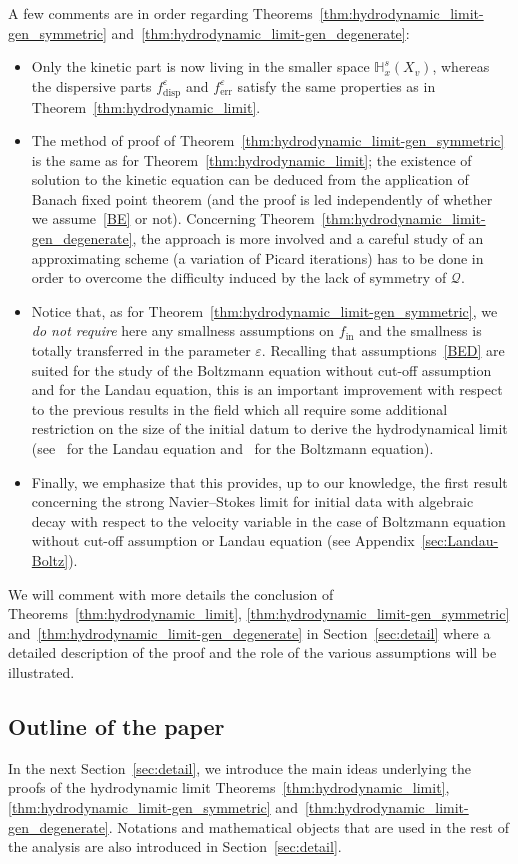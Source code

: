 \documentclass[10pt]{amsart}
\theoremstyle{definition}\newtheorem{defi}[theo]{Definition}\newtheorem{rema}[theo]{Remark}\newtheorem{exam}[theo]{Example}\newtheorem{exem}[theo]{Example}\newtheorem{nota}[theo]{Notation}
\newcommand{\ini}{\mathrm{in}}
\newcommand{\err}{\mathrm{err}}
\newcommand{\disp}{\mathrm{disp}}
\newcommand{\bbH}{\mathbb{H}}
\newcommand{\QQ}{\mathcal{Q}}
\newcommand{\Sl}{X}
\newcommand*\eps{{\varepsilon}}
\begin{document}
A few comments are in order regarding Theorems~\ref{thm:hydrodynamic_limit-gen_symmetric} and~\ref{thm:hydrodynamic_limit-gen_degenerate}:
\begin{itemize}
\item Only the kinetic part is now living in the smaller space $\bbH^s_x(\Sl_v)$, whereas the dispersive parts $f_\disp^\eps$ and $f^\eps_\err$ satisfy the same properties as in Theorem~\ref{thm:hydrodynamic_limit}.
\item The method of proof of Theorem~\ref{thm:hydrodynamic_limit-gen_symmetric} is the same as for Theorem~\ref{thm:hydrodynamic_limit}; the existence of solution to the kinetic equation can be deduced from the application of Banach fixed point theorem (and the proof is led independently of whether we assume~\eqref{BE} or not). Concerning Theorem~\ref{thm:hydrodynamic_limit-gen_degenerate}, the approach is more involved and a careful study of an approximating scheme (a variation of Picard iterations) has to be done in order to overcome the difficulty induced by the lack of symmetry of $\QQ.$
\item Notice that, as for Theorem~\ref{thm:hydrodynamic_limit-gen_symmetric}, we \emph{do not require} here any smallness assumptions on $f_{\ini}$ and the smallness is totally transferred in the parameter $\eps.$ Recalling that assumptions~\eqref{BED} are suited for the study of the Boltzmann equation without cut-off assumption and for the Landau equation, this is an important improvement with respect to the previous results in the field which all require some additional restriction on the size of the initial datum to derive the hydrodynamical limit (see~\cite{CRT2022} for the Landau equation and~\cite{CC2023} for the Boltzmann equation).
\item Finally, we emphasize that this provides, up to our knowledge, the first result concerning the strong Navier--Stokes limit for initial data with algebraic decay with respect to the velocity variable in the case of Boltzmann equation without cut-off assumption or Landau equation (see Appendix~\ref{sec:Landau-Boltz}).
\end{itemize}
We will comment with more details the conclusion of Theorems~\ref{thm:hydrodynamic_limit}, \ref{thm:hydrodynamic_limit-gen_symmetric} and~\ref{thm:hydrodynamic_limit-gen_degenerate} in Section~\ref{sec:detail} where a detailed description of the proof and the role of the various assumptions will be illustrated.

\subsection{Outline of the paper} 
In the next Section~\ref{sec:detail}, we introduce the main ideas underlying the proofs of {the hydrodynamic limit Theorems}~\ref{thm:hydrodynamic_limit}, \ref{thm:hydrodynamic_limit-gen_symmetric} and~\ref{thm:hydrodynamic_limit-gen_degenerate}. Notations and mathematical objects that are used in the rest of the analysis are also introduced in Section~\ref{sec:detail}.
\end{document}
